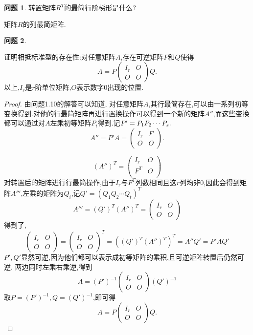 \documentclass[11pt]{ctexart}
\theoremstyle{definition}
\newtheorem{qqq}{问题}[section]
\numberwithin{equation}{section}
\begin{document}
\begin{qqq}
    转置矩阵$R^T$的最简行阶梯形是什么?
\end{qqq}
\begin{aaa}
    矩阵$R$的列最简矩阵.
\end{aaa}
\begin{qqq}
    \begin{pinked}
    证明相抵标准型的存在性:对任意矩阵$A$,存在可逆矩阵$P$和$Q$使得
    $$A=P
    \begin{pmatrix}
        I_r & O\\O & O
    \end{pmatrix}
    Q.$$
    以上,$I_r$是$r$阶单位矩阵,$O$表示数字0出现的位置.
    \end{pinked}
    
\end{qqq}
\begin{proof}
    由问题1.10的解答可以知道,\newline
    对任意矩阵$A$,其行最简存在,可以由一系列初等变换得到.对他的行最简矩阵再进行置换操作可以得到一个新的矩阵$A''$,而这些变换都可以通过对$A$左乘初等矩阵$P_i$得到.记$P'=P_1P_2\cdots P_s.\\$
    $$A''=P'A=
    \begin{pmatrix}
        I_r&F\\O&O
    \end{pmatrix}.$$
    
    $$(A'')^T=\begin{pmatrix}
        I_r&O\\F^T&O\\
    \end{pmatrix}$$
    对转置后的矩阵进行行最简操作,由于$I_r$与$F^T$列数相同且这$r$列均非0,因此会得到矩阵$A'''$,左乘的矩阵为$Q_i$,记$Q'=(Q_1Q_2\cdots Q_t)^T$
    $$A'''=(Q')^T(A'')^T=\begin{pmatrix}
        I_r&O\\O&O
    \end{pmatrix}$$
    得到了,
    $$\begin{pmatrix}
        I_r&O\\O&O
    \end{pmatrix}
    =
    \begin{pmatrix}
        I_r&O\\O&O
    \end{pmatrix}^T
    =
    ((Q')^T(A'')^T)^T
    =
    A''Q'
    =
    P'AQ'$$
    $P',Q'$显然可逆,因为他们都可以表示成初等矩阵的乘积,且可逆矩阵转置后仍然可逆.\newline
    两边同时左乘右乘逆,得到
    $$A=(P')^{-1}\begin{pmatrix}
        I_r&O\\O&O
    \end{pmatrix}(Q')^{-1}$$
    取$P=(P')^{-1},Q=(Q')^{-1}$,即可得
    $$A=P
    \begin{pmatrix}
        I_r & O\\O & O
    \end{pmatrix}
    Q.$$

    
\end{proof}    
\end{document}
